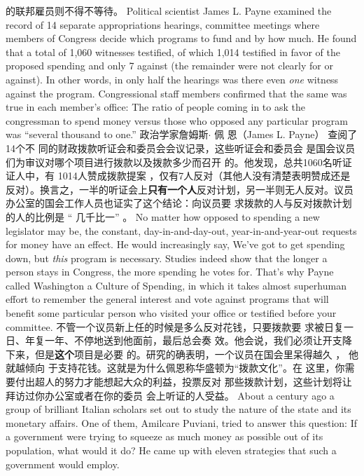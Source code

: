 \begin{paracol}{2}
的联邦雇员则不得不等待。
\switchcolumn*
Political scientist James L. Payne examined the record of 14
separate appropriations hearings, committee meetings where
members of Congress decide which programs to fund and by
how much. He found that a total of 1,060 witnesses testified, of
which 1,014 testified in favor of the proposed spending and
only 7 against (the remainder were not clearly for or against). In other words, in only half the hearings was there even \textit{one} witness
against the program. Congressional staff members confirmed
that the same was true in each member's office: The ratio of
people coming in to ask the congressman to spend money versus those who opposed any particular program was ``several
thousand to one.''
\switchcolumn
政治学家詹姆斯$\cdot$ 佩 恩（James L. Payne） 查阅了 14个不
同的财政拨款听证会和委员会会议记录，这些听证会和委员会
是国会议员们为审议对哪个项目进行拨款以及拨款多少而召开
的。他发现，总共1060名听证证人中，有 1014人赞成拨款提案 ，仅有7人反对（其他人没有清楚表明赞成还是反对）。换言之，一半的听证会上\textbf{只有一个人}反对计划，另一半则无人反对。议员办公室的国会工作人员也证实了这个结论：向议员要
求拨款的人与反对拨款计划的人的比例是 “ 几千比一” 。
\switchcolumn*
No matter how opposed to spending a new legislator may
be, the constant, day-in-and-day-out, year-in-and-year-out requests for money have an effect. He would increasingly say,
We've got to get spending down, but \textit{this} program is necessary.
Studies indeed show that the longer a person stays in Congress,
the more spending he votes for. That's why Payne called Washington a Culture of Spending, in which it takes almost superhuman effort to remember the general interest and vote against
programs that will benefit some particular person who visited
your office or testified before your committee.
\switchcolumn
不管一个议员新上任的时候是多么反对花钱，只要拨款要
求被日复一日、年复一年、不停地送到他面前，最后总会奏
效。他会说，我们必须让开支降下来，但是\textbf{这个}项目是必要
的。研究的确表明，一个议员在国会里呆得越久 ， 他就越倾向
于支持花钱。这就是为什么佩恩称华盛顿为“拨款文化”。在
这里，你需要付出超人的努力才能想起大众的利益，投票反对
那些拨款计划，这些计划将让拜访过你办公室或者在你的委员
会上听证的人受益。
\switchcolumn*
About a century ago a group of brilliant Italian scholars set
out to study the nature of the state and its monetary affairs.
One of them, Amilcare Puviani, tried to answer this question: If
a government were trying to squeeze as much money as possible out of its population, what would it do? He came up with
eleven strategies that such a government would employ.

\end{paracol}
